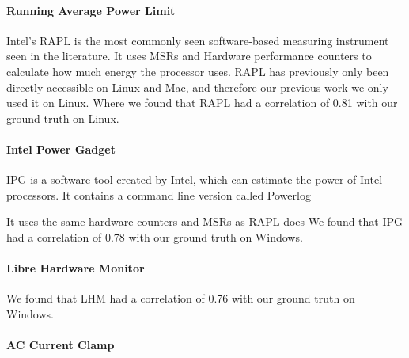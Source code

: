 \paragraph{Running Average Power Limit}
Intel's RAPL is the most commonly seen software-based measuring instrument seen in the literature. It uses MSRs and Hardware performance counters to calculate how much energy the processor uses. RAPL has previously only been directly accessible on Linux and Mac, and therefore our previous work we only used it on Linux. Where we found that RAPL had a correlation of 0.81 with our ground truth on Linux.\cite{biksbois}
\paragraph{Intel Power Gadget}
IPG is a software tool created by Intel, which can estimate the power of Intel processors. It contains a command line version called Powerlog

It uses the same hardware counters and MSRs as RAPL does
We found that IPG had a correlation of 0.78 with our ground truth on Windows.\cite{biksbois}




\paragraph{Libre Hardware Monitor}

We found that LHM had a correlation of 0.76 with our ground truth on Windows.\cite{biksbois}
\paragraph{AC Current Clamp}

